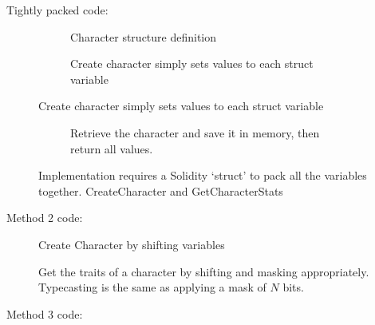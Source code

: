 \begin{appendices}
Tightly packed code:
\begin{figure}[H]
  \begin{subfigure}[b]{\textwidth}
    \centering
    
    \caption{Character structure definition}
    \label{fig:struct_optimization:a}
  \end{subfigure}

  \begin{subfigure}[b]{\textwidth}
    \centering
    
    \caption{Create character simply sets values to each struct variable}
    \label{fig:struct_optimization:b}
  \end{subfigure}
\end{figure}

\begin{figure}[H] \ContinuedFloat
  \begin{subfigure}[b]{\textwidth}
    \centering
    
    \caption{Retrieve the character and save it in memory, then return all values.}
    \label{fig:struct_optimization:c}
  \end{subfigure}
  \caption{Implementation requires a Solidity `struct' to pack all the variables together. CreateCharacter and GetCharacterStats  }
  \label{fig:struct_optimization}
\end{figure}

Method 2 code:

\begin{figure}[H]
    \centering
    
    \caption{Create Character by shifting variables}
    \label{fig:uint_encoding_code}
\end{figure}

\begin{figure}[H] 
    \centering
    
    \caption{Get the traits of a character by shifting and masking appropriately. Typecasting is the same as applying a mask of $N$ bits.}
    \label{fig:uint_decoding_code}
\end{figure}

Method 3 code:


\end{appendices}
